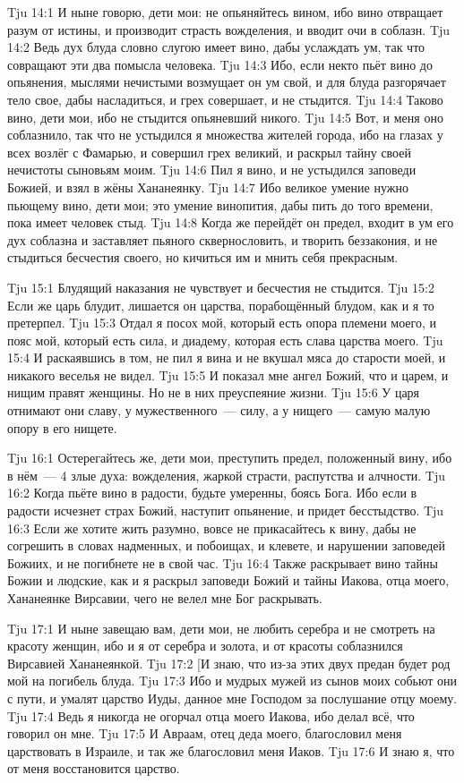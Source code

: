 \vs Tju 14:1
И ныне говорю, дети мои: не опьяняйтесь вином,
ибо вино отвращает разум от истины,
и производит страсть вожделения,
и вводит очи в соблазн.
\vs Tju 14:2
Ведь дух блуда словно слугою имеет вино, дабы услаждать ум,
так что совращают эти два помысла человека.
\vs Tju 14:3
Ибо, если некто пьёт вино до опьянения,
мыслями нечистыми возмущает он ум свой,
и для блуда разгорячает тело свое,
дабы насладиться, и грех совершает, и не стыдится.
\vs Tju 14:4
Таково вино, дети мои, ибо не стыдится опьяневший никого.
\vs Tju 14:5
Вот, и меня оно соблазнило,
так что не устыдился я множества жителей города,
ибо на глазах у всех возлёг с Фамарью,
и совершил грех великий, и раскрыл тайну своей нечистоты сыновьям моим.
\vs Tju 14:6
Пил я вино, и не устыдился заповеди Божией, и взял в жёны Хананеянку.
\vs Tju 14:7
Ибо великое умение нужно пьющему вино, дети мои; это умение винопития,
дабы пить до того времени, пока имеет человек стыд.
\vs Tju 14:8
Когда же перейдёт он предел, входит в ум его дух соблазна
и заставляет пьяного сквернословить,
и творить беззакония, и не стыдиться бесчестия своего,
но кичиться им и мнить себя прекрасным.

\vs Tju 15:1
Блудящий наказания не чувствует и бесчестия не стыдится.
\vs Tju 15:2
Если же царь блудит, лишается он царства,
порабощённый блудом, как и я то претерпел.
\vs Tju 15:3
Отдал я посох мой, который есть опора племени моего,
и пояс мой, который есть сила,
и диадему, которая есть слава царства моего.
\vs Tju 15:4
И раскаявшись в том, не пил я вина и не вкушал мяса до старости моей,
и никакого веселья не видел.
\vs Tju 15:5
И показал мне ангел Божий, что и царем, и нищим правят женщины.
Но не в них преуспеяние жизни.
\vs Tju 15:6
У царя отнимают они славу,
у мужественного~--- силу,
а у нищего~--- самую малую опору в его нищете.

\vs Tju 16:1
Остерегайтесь же, дети мои, преступить предел, положенный вину,
ибо в нём~--- 4 злые духа:
вожделения, жаркой страсти, распутства и алчности.
\vs Tju 16:2
Когда пьёте вино в радости, будьте умеренны, боясь Бога.
Ибо если в радости исчезнет страх Божий, наступит опьянение,
и придет бесстыдство.
\vs Tju 16:3
Если же хотите жить разумно, вовсе не прикасайтесь к вину,
дабы не согрешить в словах надменных, и побоищах, и клевете,
и нарушении заповедей Божиих, и не погибнете не в свой час.
\vs Tju 16:4
Также раскрывает вино тайны Божии и людские,
как и я раскрыл заповеди Божий и тайны Иакова, отца моего,
Хананеянке Вирсавии, чего не велел мне Бог раскрывать.

\vs Tju 17:1
И ныне завещаю вам, дети мои,
не любить серебра и не смотреть на красоту женщин,
ибо и я от серебра и золота, и от красоты соблазнился Вирсавией Хананеянкой.
\vs Tju 17:2
[И знаю, что из-за этих двух предан будет род мой на погибель блуда.
\vs Tju 17:3
Ибо и мудрых мужей из сынов моих собьют они с пути,
и умалят царство Иуды, данное мне Господом за послушание отцу моему.
\vs Tju 17:4
Ведь я никогда не огорчал отца моего Иакова, ибо делал всё,
что говорил он мне.
\vs Tju 17:5
И Авраам, отец деда моего, благословил меня царствовать в Израиле,
и так же благословил меня Иаков.
\vs Tju 17:6
И знаю я, что от меня восстановится царство.

